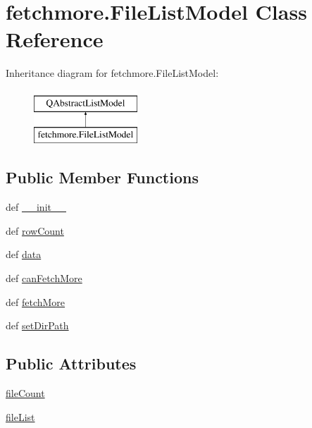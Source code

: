 \hypertarget{classfetchmore_1_1FileListModel}{}\section{fetchmore.\+File\+List\+Model Class Reference}
\label{classfetchmore_1_1FileListModel}
Inheritance diagram for fetchmore.\+File\+List\+Model\+:\begin{figure}[H]
\begin{center}
\leavevmode
\includegraphics[height=2.000000cm]{classfetchmore_1_1FileListModel}
\end{center}
\end{figure}
\subsection*{Public Member Functions}
\begin{DoxyCompactItemize}
\item 
def \hyperlink{classfetchmore_1_1FileListModel_a07147adef5c12883eaefcb1cc119c7f4}{\+\_\+\+\_\+init\+\_\+\+\_\+}
\item 
def \hyperlink{classfetchmore_1_1FileListModel_a1001d4cc162700251e9b4e475f66ae08}{row\+Count}
\item 
def \hyperlink{classfetchmore_1_1FileListModel_afceb06693c2134edb90e6ebff79bde81}{data}
\item 
def \hyperlink{classfetchmore_1_1FileListModel_a6d3bd60340e1d3584f547770c1f96772}{can\+Fetch\+More}
\item 
def \hyperlink{classfetchmore_1_1FileListModel_a9c9d2dcf25243a40dadc725886f4f899}{fetch\+More}
\item 
def \hyperlink{classfetchmore_1_1FileListModel_a077aaf5402d7575202663e5afd917ef3}{set\+Dir\+Path}
\end{DoxyCompactItemize}
\subsection*{Public Attributes}
\begin{DoxyCompactItemize}
\item 
\hyperlink{classfetchmore_1_1FileListModel_a160476fdb5423065c0072d177ec6c5ea}{file\+Count}
\item 
\hyperlink{classfetchmore_1_1FileListModel_af9a175a0daf4fb72316f49960e3838ef}{file\+List}
\end{DoxyCompactItemize}
